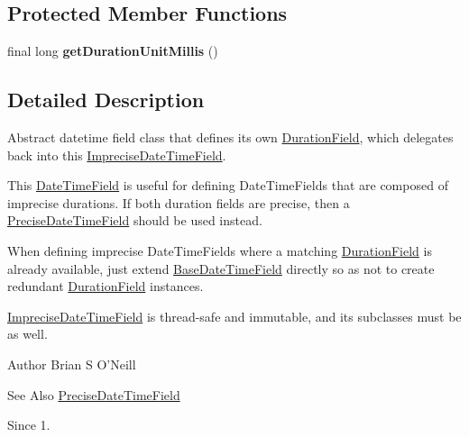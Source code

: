 \subsection*{Protected Member Functions}
\begin{DoxyCompactItemize}
\item 
\hypertarget{classorg_1_1joda_1_1time_1_1field_1_1_imprecise_date_time_field_a6cbcb8bdd3909d0f2f632b75b2731c28}{final long {\bfseries get\-Duration\-Unit\-Millis} ()}\label{classorg_1_1joda_1_1time_1_1field_1_1_imprecise_date_time_field_a6cbcb8bdd3909d0f2f632b75b2731c28}

\end{DoxyCompactItemize}


\subsection{Detailed Description}
Abstract datetime field class that defines its own \hyperlink{classorg_1_1joda_1_1time_1_1_duration_field}{Duration\-Field}, which delegates back into this \hyperlink{classorg_1_1joda_1_1time_1_1field_1_1_imprecise_date_time_field}{Imprecise\-Date\-Time\-Field}. 

This \hyperlink{classorg_1_1joda_1_1time_1_1_date_time_field}{Date\-Time\-Field} is useful for defining Date\-Time\-Fields that are composed of imprecise durations. If both duration fields are precise, then a \hyperlink{classorg_1_1joda_1_1time_1_1field_1_1_precise_date_time_field}{Precise\-Date\-Time\-Field} should be used instead. 

When defining imprecise Date\-Time\-Fields where a matching \hyperlink{classorg_1_1joda_1_1time_1_1_duration_field}{Duration\-Field} is already available, just extend \hyperlink{classorg_1_1joda_1_1time_1_1field_1_1_base_date_time_field}{Base\-Date\-Time\-Field} directly so as not to create redundant \hyperlink{classorg_1_1joda_1_1time_1_1_duration_field}{Duration\-Field} instances. 

\hyperlink{classorg_1_1joda_1_1time_1_1field_1_1_imprecise_date_time_field}{Imprecise\-Date\-Time\-Field} is thread-\/safe and immutable, and its subclasses must be as well.

\begin{DoxyAuthor}{Author}
Brian S O'Neill 
\end{DoxyAuthor}
\begin{DoxySeeAlso}{See Also}
\hyperlink{classorg_1_1joda_1_1time_1_1field_1_1_precise_date_time_field}{Precise\-Date\-Time\-Field} 
\end{DoxySeeAlso}
\begin{DoxySince}{Since}
1. 
\end{DoxySince}


